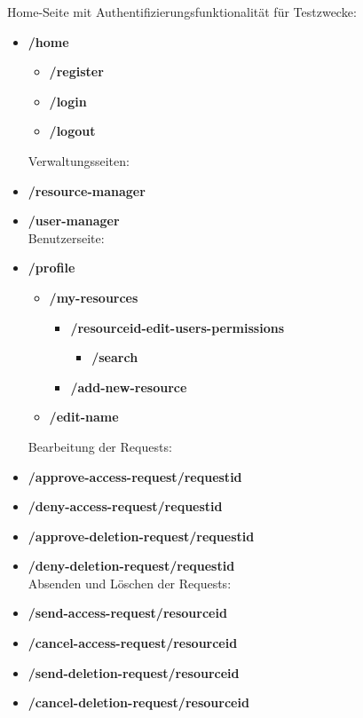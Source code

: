 \documentclass[parskip=full,11pt]{scrartcl}
\begin{document}
\indent Home-Seite mit Authentifizierungsfunktionalität für Testzwecke:
\begin{itemize}[itemsep=0pt]
\item \textbf{/home}
	\begin{itemize}[itemsep=0pt]
	\item \textbf{/register}
	\item \textbf{/login}
	\item \textbf{/logout}\\
	\end{itemize}

\noindent Verwaltungsseiten:
\item \textbf{/resource-manager}
\item \textbf{/user-manager}\\

\noindent Benutzerseite:
\item \textbf{/profile}
	\begin{itemize}[itemsep=0pt]
	\item \textbf{/my-resources}
		\begin{itemize}
		\item \textbf{/resourceid-edit-users-permissions}
			\begin{itemize}
			\item \textbf{/search}
			\end{itemize}
		\item \textbf{/add-new-resource}		
		\end{itemize}
	\item \textbf{/edit-name}\\
	\end{itemize}

\noindent Bearbeitung der Requests:
\item \textbf{/approve-access-request/requestid}
\item \textbf{/deny-access-request/requestid}
\item \textbf{/approve-deletion-request/requestid}
\item \textbf{/deny-deletion-request/requestid}\\

\noindent Absenden und Löschen der Requests:
\item \textbf{/send-access-request/resourceid}
\item \textbf{/cancel-access-request/resourceid}
\item \textbf{/send-deletion-request/resourceid}
\item \textbf{/cancel-deletion-request/resourceid}\\


\end{itemize}
\end{document}
